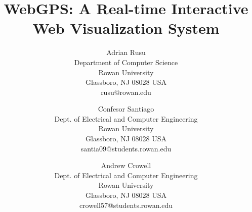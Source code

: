 \documentclass[10pt,psfig]{article}
\begin{document}
\newif \iffull \fulltrue

%
%

%


\title {WebGPS: A Real-time Interactive Web Visualization System}

\author{Adrian Rusu\\
        Department of Computer Science\\
        Rowan University\\
        Glassboro, NJ 08028 USA\\
        rusu@rowan.edu
\and
        Confesor Santiago\\
        Dept. of Electrical and Computer Engineering\\
        Rowan University\\
        Glassboro, NJ 08028 USA\\
        santia09@students.rowan.edu
\and
        Andrew Crowell\\
        Dept. of Electrical and Computer Engineering\\
        Rowan University\\
        Glassboro, NJ 08028 USA\\
        crowell57@students.rowan.edu}


\date{}
\end{document}
